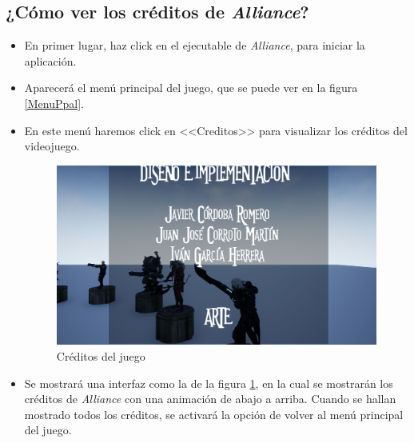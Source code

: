 \subsection{¿Cómo ver los créditos de \textit{Alliance}?}
\begin{itemize}
\item En primer lugar, haz click en el ejecutable de \textit{Alliance}, para iniciar la aplicación.
\item Aparecerá el menú principal del juego, que se puede ver en la figura \ref{MenuPpal}.
\item En este menú haremos click en <<Creditos>> para visualizar los créditos del videojuego.

\begin{figure}[H]
  \centering
  \includegraphics[width=12cm]{./images/Creditos.png}
  \caption{Créditos del juego}
  \label{Creditos}
\end{figure}

\item Se mostrará una interfaz como la de la figura \ref{Creditos}, en la cual se mostrarán los créditos de \textit{Alliance} con una animación de abajo a arriba. Cuando se hallan mostrado todos los créditos, se activará la opción de volver al menú principal del juego.
\end{itemize}
